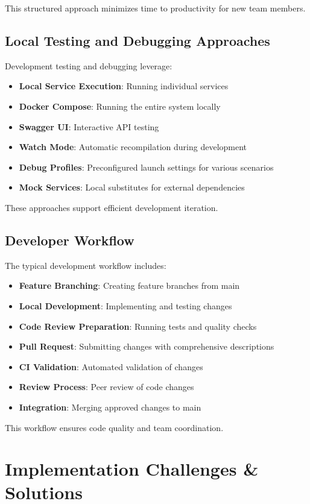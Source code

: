 This structured approach minimizes time to productivity for new team members.

\subsection{Local Testing and Debugging Approaches}
Development testing and debugging leverage:
\begin{itemize}
    \item \textbf{Local Service Execution}: Running individual services
    \item \textbf{Docker Compose}: Running the entire system locally
    \item \textbf{Swagger UI}: Interactive API testing
    \item \textbf{Watch Mode}: Automatic recompilation during development
    \item \textbf{Debug Profiles}: Preconfigured launch settings for various scenarios
    \item \textbf{Mock Services}: Local substitutes for external dependencies
\end{itemize}

These approaches support efficient development iteration.

\subsection{Developer Workflow}
The typical development workflow includes:
\begin{itemize}
    \item \textbf{Feature Branching}: Creating feature branches from main
    \item \textbf{Local Development}: Implementing and testing changes
    \item \textbf{Code Review Preparation}: Running tests and quality checks
    \item \textbf{Pull Request}: Submitting changes with comprehensive descriptions
    \item \textbf{CI Validation}: Automated validation of changes
    \item \textbf{Review Process}: Peer review of code changes
    \item \textbf{Integration}: Merging approved changes to main
\end{itemize}

This workflow ensures code quality and team coordination.

\section{Implementation Challenges \& Solutions}

